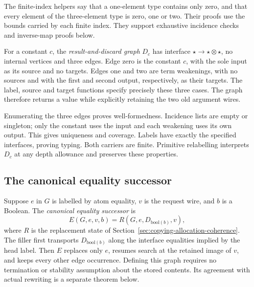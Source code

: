The finite-index helpers say that a one-element type contains only zero,
and that every element of the three-element type is zero, one or two.
Their proofs use the bounds carried by each finite index. They support
exhaustive incidence checks and inverse-map proofs below.



For a constant $c$, the \emph{result-and-discard graph} $D_c$ has interface
$\star\to\star\otimes\star$, no internal vertices and three edges. Edge zero
is the constant $c$, with the sole input as its source and no targets.
Edges one and two are term weakenings, with no sources and with the first
and second output, respectively, as their targets. The label, source and
target functions specify precisely these three cases. The graph therefore
returns a value while explicitly retaining the two old argument wires.




Enumerating the three edges proves well-formedness. Incidence lists are
empty or singleton; only the constant uses the input and each weakening
uses its own output. This gives uniqueness and coverage. Labels have exactly
the specified interfaces, proving typing. Both carriers are finite.
Primitive relabelling interprets $D_c$ at any depth allowance and preserves
these properties.



\subsection{The canonical equality successor}

Suppose $e$ in $G$ is labelled by atom equality, $v$ is the request wire, and
$b$ is a Boolean. The \emph{canonical equality successor} is
\[
 E(G,e,v,b)=R(G,e,D_{\mathrm{bool}(b)},v),
\]
where $R$ is the replacement state of
Section~\ref{sec:copying-allocation-coherence}. The filler first transports
$D_{\mathrm{bool}(b)}$ along the interface equalities implied by the head label.
Then $E$ replaces only $e$, resumes search at the retained image of $v$, and
keeps every other edge occurrence. Defining this graph requires no termination
or stability assumption about the stored contents. Its agreement with actual
rewriting is a separate theorem below.

